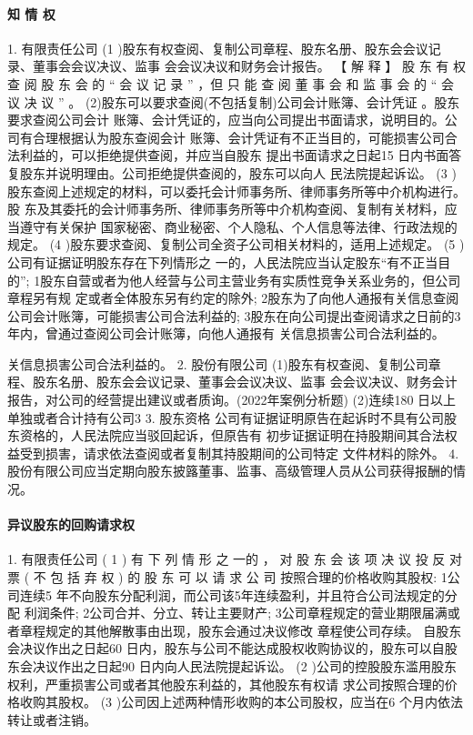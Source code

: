 \documentclass[UTF8,12pt]{ctexart}
\numberwithin{equation}{section} %
\numberwithin{figure}{section}
\numberwithin{table}{section}
\begin{document}
	\paragraph{知 情 权}
	1. 有限责任公司
	(1 )股东有权查阅、复制公司章程、股东名册、股东会会议记录、董事会会议决议、监事 会会议决议和财务会计报告。
	【 解 释 】 股 东 有 权 查 阅 股 东 会 的 “ 会 议 记 录 ” ，但 只 能 查 阅 董 事 会 和 监 事 会 的 “ 会 议 决 议 ” 。 (2)股东可以要求查阅(不包括复制)公司会计账簿、会计凭证 。股东要求查阅公司会计 账簿、会计凭证的，应当向公司提出书面请求，说明目的。公司有合理根据认为股东查阅会计 账簿、会计凭证有不正当目的，可能损害公司合法利益的，可以拒绝提供查阅，并应当自股东 提出书面请求之日起15 日内书面答复股东并说明理由。公司拒绝提供查阅的，股东可以向人 民法院提起诉讼。
	(3 )股东查阅上述规定的材料，可以委托会计师事务所、律师事务所等中介机构进行。股 东及其委托的会计师事务所、律师事务所等中介机构查阅、复制有关材料，应当遵守有关保护 国家秘密、商业秘密、个人隐私、个人信息等法律、行政法规的规定。
	(4 )股东要求查阅、复制公司全资子公司相关材料的，适用上述规定。
	(5 )公司有证据证明股东存在下列情形之 一的，人民法院应当认定股东“有不正当目的”; 1股东自营或者为他人经营与公司主营业务有实质性竞争关系业务的，但公司章程另有规 定或者全体股东另有约定的除外; 2股东为了向他人通报有关信息查阅公司会计账簿，可能损害公司合法利益的; 3股东在向公司提出查阅请求之日前的3 年内，曾通过查阅公司会计账簿，向他人通报有 关信息损害公司合法利益的。
	
	关信息损害公司合法利益的。
	2. 股份有限公司 (1)股东有权查阅、复制公司章程、股东名册、股东会会议记录、董事会会议决议、监事 会会议决议、财务会计报告，对公司的经营提出建议或者质询。(2022年案例分析题) (2)连续180 日以上单独或者合计持有公司3%
	3. 股东资格 公司有证据证明原告在起诉时不具有公司股东资格的，人民法院应当驳回起诉，但原告有 初步证据证明在持股期间其合法权益受到损害，请求依法查阅或者复制其持股期间的公司特定 文件材料的除外。
	4. 股份有限公司应当定期向股东披簬董事、监事、高级管理人员从公司获得报酬的情况。
	
	\paragraph{异议股东的回购请求权}
	1. 有限责任公司
	( 1 ) 有 下 列 情 形 之 一的 ， 对 股 东 会 该 项 决 议 投 反 对 票 ( 不 包 括 弃 权 ) 的 股 东 可 以 请 求 公 司 按照合理的价格收购其股权:
	1公司连续5 年不向股东分配利润，而公司该5年连续盈利，并且符合公司法规定的分配 利润条件;
	2公司合并、分立、转让主要财产; 3公司章程规定的营业期限届满或者章程规定的其他解散事由出现，股东会通过决议修改 章程使公司存续。
	自股东会决议作出之日起60 日内，股东与公司不能达成股权收购协议的，股东可以自股 东会决议作出之日起90 日内向人民法院提起诉讼。
	(2 )公司的控股股东滥用股东权利，严重损害公司或者其他股东利益的，其他股东有权请 求公司按照合理的价格收购其股权。
	(3 )公司因上述两种情形收购的本公司股权，应当在6 个月内依法转让或者注销。
	
\end{document}
